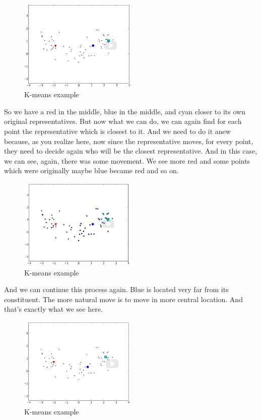\documentclass[a4paper, 12pt]{article}
\begin{document}
\begin{figure}[H]
\centering
\includegraphics[width=0.5\textwidth]{./pic/k-means-03.png}
\caption{\label{fig:orgf4bdbb3}K-means example}
\end{figure}

So we have a red in the middle, blue in the middle, and cyan closer to its own
original representatives. But now what we can do, we can again find for each
point the representative which is closest to it. And we need to do it anew
because, as you realize here, now since the representative moves, for every
point, they need to decide again who will be the closest representative. And in
this case, we can see, again, there was some movement. We see more red and some
points which were originally maybe blue became red and so on.

\begin{figure}[H]
\centering
\includegraphics[width=0.5\textwidth]{./pic/k-means-04.png}
\caption{\label{fig:org5e0f8ba}K-means example}
\end{figure}

And we can continue this process again. Blue is located very far from its
constituent. The more natural move is to move in more central location. And
that's exactly what we see here.

\begin{figure}[H]
\centering
\includegraphics[width=0.5\textwidth]{./pic/k-means-05.png}
\caption{\label{fig:org812d930}K-means example}
\end{figure}
\end{document}
